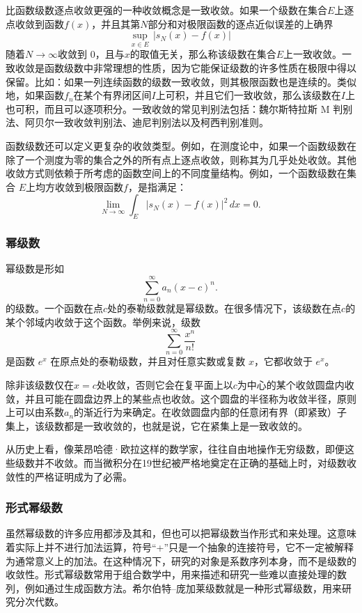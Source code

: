 比函数级数逐点收敛更强的一种收敛概念是一致收敛。如果一个级数在集合$E$上逐点收敛到函数$f(x)$，并且其第$N$部分和对极限函数的逐点近似误差的上确界
$$
\sup_{x \in E} \, \bigl| s_{N}(x) - f(x) \bigr|~
$$
随着$N \to \infty$收敛到 0，且与$x$的取值无关，那么称该级数在集合$E$上一致收敛。一致收敛是函数级数中非常理想的性质，因为它能保证级数的许多性质在极限中得以保留。比如：如果一列连续函数的级数一致收敛，则其极限函数也是连续的。类似地，如果函数$f_{n}$在某个有界闭区间$I$上可积，并且它们一致收敛，那么该级数在$I$上也可积，而且可以逐项积分。一致收敛的常见判别法包括：魏尔斯特拉斯 M 判别法、阿贝尔一致收敛判别法、迪尼判别法以及柯西判别准则。

函数级数还可以定义更复杂的收敛类型。例如，在测度论中，如果一个函数级数在除了一个测度为零的集合之外的所有点上逐点收敛，则称其为几乎处处收敛。其他收敛方式则依赖于所考虑的函数空间上的不同度量结构。例如，一个函数级数在集合 $E$上均方收敛到极限函数$f$，是指满足：
$$
\lim_{N \to \infty} \int_{E} \bigl| s_{N}(x) - f(x) \bigr|^{2} \, dx = 0 .~
$$
\subsubsection{幂级数}
幂级数是形如
$$
\sum_{n=0}^{\infty} a_{n}(x-c)^{n}.~
$$
的级数。一个函数在点$c$处的泰勒级数就是幂级数。在很多情况下，该级数在点$c$的某个邻域内收敛于这个函数。举例来说，级数
$$
\sum_{n=0}^{\infty} \frac{x^{n}}{n!}~
$$
是函数 $e^{x}$ 在原点处的泰勒级数，并且对任意实数或复数 $x$，它都收敛于 $e^{x}$。

除非该级数仅在$x=c$处收敛，否则它会在复平面上以$c$为中心的某个收敛圆盘内收敛，并且可能在圆盘边界上的某些点也收敛。这个圆盘的半径称为收敛半径，原则上可以由系数$a_{n}$的渐近行为来确定。在收敛圆盘内部的任意闭有界（即紧致）子集上，该级数都是一致收敛的，也就是说，它在紧集上是一致收敛的。

从历史上看，像莱昂哈德·欧拉这样的数学家，往往自由地操作无穷级数，即便这些级数并不收敛。而当微积分在19世纪被严格地奠定在正确的基础上时，对级数收敛性的严格证明成为了必需。
\subsubsection{形式幂级数}
虽然幂级数的许多应用都涉及其和，但也可以把幂级数当作形式和来处理。这意味着实际上并不进行加法运算，符号“+”只是一个抽象的连接符号，它不一定被解释为通常意义上的加法。在这种情况下，研究的对象是系数序列本身，而不是级数的收敛性。形式幂级数常用于组合数学中，用来描述和研究一些难以直接处理的数列，例如通过生成函数方法。希尔伯特–庞加莱级数就是一种形式幂级数，用来研究分次代数。

